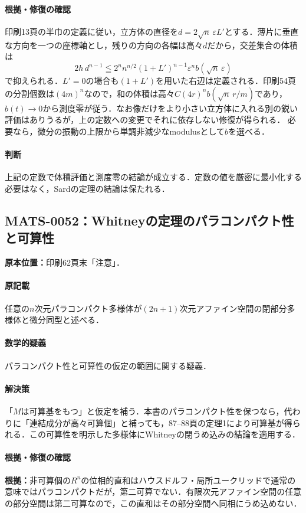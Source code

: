 \documentclass[a4paper,10pt]{ltjsarticle}
\begin{document}
\paragraph{根拠・修復の確認}印刷13頁の半巾の定義に従い，立方体の直径を$d=2\sqrt n\,\varepsilon L\prime$とする．薄片に垂直な方向を一つの座標軸とし，残りの方向の各幅は高々$d$だから，交差集合の体積は
\[
 2h\,d^{n-1}\leqq 2^n n^{n/2}(1+L\prime)^{n-1}
 \varepsilon^n b(\sqrt n\,\varepsilon)
\]
で抑えられる．$L\prime=0$の場合も$(1+L\prime)$を用いた右辺は定義される．印刷54頁の分割個数は$(4m)^n$なので，和の体積は高々$C(4r)^nb(\sqrt n\,r/m)$であり，$b(t)\to0$から測度零が従う．なお像だけをより小さい立方体に入れる別の鋭い評価はありうるが，上の定数への変更でそれに依存しない修復が得られる． 必要なら，微分の振動の上限から単調非減少なmodulusとして$b$を選べる．

\paragraph{判断}上記の定数で体積評価と測度零の結論が成立する．定数の値を厳密に最小化する必要はなく，Sardの定理の結論は保たれる．


\subsection*{MATS-0052：Whitneyの定理のパラコンパクト性と可算性}\label{math:MATS-0052}
\noindent\textbf{原本位置：}印刷62頁末「注意」．

\paragraph{原記載}任意の$n$次元パラコンパクト多様体が$(2n+1)$次元アファイン空間の閉部分多様体と微分同型と述べる．

\paragraph{数学的疑義}パラコンパクト性と可算性の仮定の範囲に関する疑義．

\paragraph{解決策}「$M$は可算基をもつ」と仮定を補う．本書のパラコンパクト性を保つなら，代わりに「連結成分が高々可算個」と補っても，87--88頁の定理1により可算基が得られる．この可算性を明示した多様体にWhitneyの閉うめ込みの結論を適用する．

\paragraph{根拠・修復の確認}\textbf{根拠：}非可算個の$R^n$の位相的直和はハウスドルフ・局所ユークリッドで通常の意味ではパラコンパクトだが，第二可算でない．有限次元アファイン空間の任意の部分空間は第二可算なので，この直和はその部分空間へ同相にうめ込めない．
\end{document}
